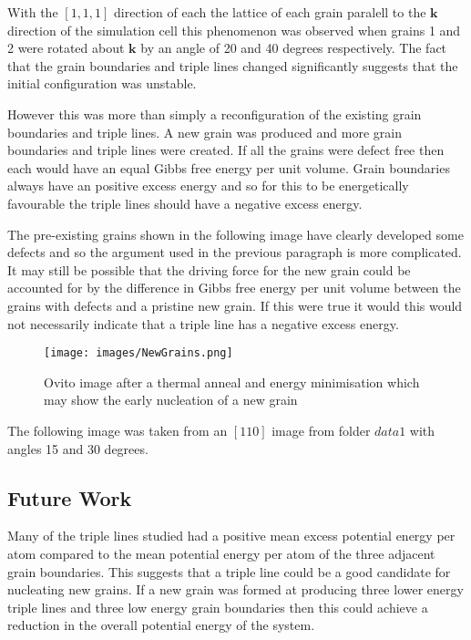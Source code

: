 \documentclass[12pt,a4paper]{book}
\begin{document}
With the $[1,1,1]$ direction of each the lattice of each grain paralell to the $\mathbf{k}$ direction of the simulation cell this phenomenon was observed when grains 1 and 2 were rotated about $\mathbf{k}$  by an angle of 20 and 40 degrees respectively. The fact that the grain boundaries and triple lines changed significantly suggests that the initial configuration was unstable. 

However this was more than simply a reconfiguration of the existing grain boundaries and triple lines. A new grain was produced and more grain boundaries and triple lines were created. If all the grains were defect free then each would have an equal Gibbs free energy per unit volume. Grain boundaries always have an positive excess energy and so for this to be energetically favourable the triple lines should have a negative excess energy.

The pre-existing grains shown in the following image have clearly developed some defects and so the argument used in the previous paragraph is more complicated. It may still be possible that the driving force for the new grain could be accounted for by the difference in Gibbs free energy per unit volume between the grains with defects and a pristine new grain. If this were true it would this would not necessarily indicate that a triple line has a negative excess energy.

\begin{figure}
	\centering
	\texttt{[image: images/NewGrains.png]} 
	\label{fig:NewGrains}
	\caption{Ovito image after a thermal anneal and energy minimisation which may show the early nucleation of a new grain}
\end{figure}

The following image was taken from an $[1 1 0]$ image from folder $data1$ with angles 15 and 30 degrees.


\subsection{Future Work}


Many of the triple lines studied had a positive mean excess potential energy per atom compared to the mean potential energy per atom of the three adjacent grain boundaries. This suggests that a triple line could be a good candidate for nucleating new grains. If a new grain was formed at producing three lower energy triple lines and three low energy grain boundaries then this could achieve a reduction in the overall potential energy of the system.
\end{document}
